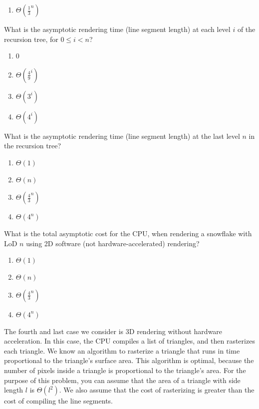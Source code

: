 \documentclass[12pt,twoside]{article}
\begin{document}
\begin{problems}
\begin{problemparts}
\begin{enumerate}
      \item $\Theta(\frac{1}{3}^n)$
    \end{enumerate}
  \problempart {} What is the asymptotic rendering time (line segment
  length) at each level $i$ of the recursion tree, for $0 \le i < n$?
    \begin{enumerate}
      \item 0
      \item $\Theta(\frac{4}{9} ^ i)$
      \item $\Theta(3 ^ i)$
      \item $\Theta(4 ^ i)$
    \end{enumerate}
  \problempart {} What is the asymptotic rendering time (line segment
  length) at the last level $n$ in the recursion tree?
    \begin{enumerate}
      \item $\Theta(1)$
      \item $\Theta(n)$
      \item $\Theta(\frac{4}{3}^n)$
      \item $\Theta(4^n)$
    \end{enumerate}
  \problempart {} What is the total asymptotic cost for the CPU, when rendering
  a snowflake with LoD $n$ using 2D software (not hardware-accelerated)
  rendering?
   \begin{enumerate}
      \item $\Theta(1)$
      \item $\Theta(n)$
      \item $\Theta(\frac{4}{3}^n)$
      \item $\Theta(4^n)$
    \end{enumerate}
\end{problemparts}

The fourth and last case we consider is 3D rendering without hardware
acceleration. In this case, the CPU compiles a list of triangles, and then
rasterizes each triangle. We know an algorithm to rasterize a triangle that
runs in time proportional to the triangle's surface area. This algorithm is
optimal, because the number of pixels inside a triangle is proportional to the
triangle's area. For the purpose of this problem, you can assume that the area
of a triangle with side length $l$ is $\Theta(l^2)$. We also assume that the
cost of rasterizing is greater than the cost of compiling the line segments.


\end{problems}
\end{document}
